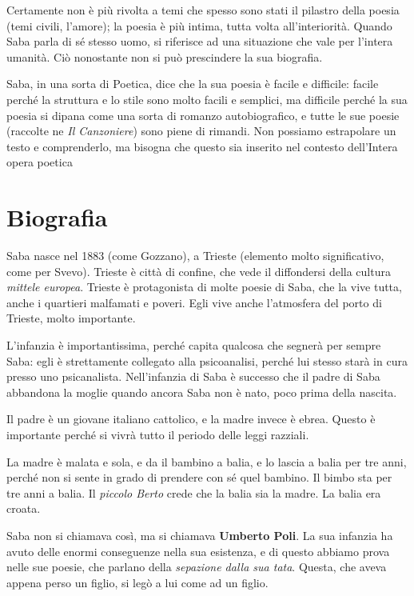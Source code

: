 \documentclass[a4paper, twoside, titlepage]{book}
\begin{document}
Certamente non è più rivolta a temi che spesso sono stati il pilastro della poesia (temi civili, l’amore); la poesia è più intima, tutta volta all’interiorità. 
Quando Saba parla di sé stesso uomo, si riferisce ad una situazione che vale per l’intera umanità.
Ciò nonostante non si può prescindere la sua biografia.

Saba, in una sorta di Poetica, dice che la sua poesia è facile e difficile: facile perché la struttura e lo stile sono molto facili e semplici, ma difficile perché la sua poesia si dipana come una sorta di romanzo autobiografico, e tutte le sue poesie (raccolte ne \textit{Il Canzoniere}) sono piene di rimandi.
Non possiamo estrapolare un testo e comprenderlo, ma bisogna che questo sia inserito nel contesto dell’Intera opera poetica

\section{Biografia}

Saba nasce nel 1883 (come Gozzano), a Trieste (elemento molto significativo, come per Svevo).
Trieste è città di confine, che vede il diffondersi della cultura \textit{mittele europea}.
Trieste è protagonista di molte poesie di Saba, che la vive tutta, anche i quartieri malfamati e poveri. Egli vive anche l’atmosfera del porto di Trieste, molto importante.

L’infanzia è importantissima, perché capita qualcosa che segnerà per sempre Saba: egli è strettamente collegato alla psicoanalisi, perché lui stesso starà in cura presso uno psicanalista.
Nell’infanzia di Saba è successo che il padre di Saba abbandona la moglie quando ancora Saba non è nato, poco prima della nascita. 

Il padre è un giovane italiano cattolico, e la madre invece è ebrea. Questo è importante perché si vivrà tutto il periodo delle leggi razziali.

La madre è malata e sola, e da il bambino a balia, e lo lascia a balia per tre anni, perché non si sente in grado di prendere con sé quel bambino. Il bimbo sta per tre anni a balia.
Il \textit{piccolo Berto} crede che la balia sia la madre. La balia era croata.

Saba non si chiamava così, ma si chiamava \textbf{Umberto Poli}. La sua infanzia ha avuto delle enormi conseguenze nella sua esistenza, e di questo abbiamo prova nelle sue poesie, che parlano della \textit{sepazione dalla sua tata}.
Questa, che aveva appena perso un figlio, si legò a lui come ad un figlio.
\end{document}
